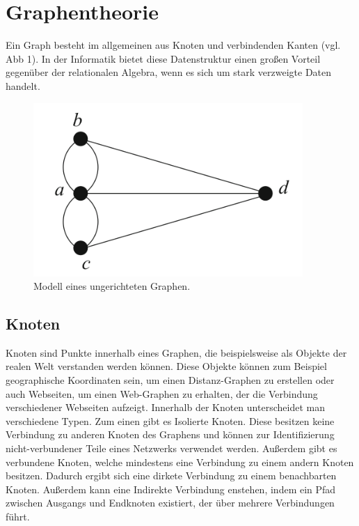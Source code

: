 \section{Graphentheorie} %
\label{sec:graphentheorie}
Ein Graph besteht im allgemeinen aus Knoten und verbindenden Kanten (vgl. Abb 1). In der Informatik bietet diese Datenstruktur einen großen Vorteil gegenüber der relationalen Algebra, wenn es sich um stark verzweigte Daten handelt. \citep{graphTheory}

\begin{figure}[h!]
	\centering
	\includegraphics[scale=1]{Illustrations/graph.png}
	\caption{Modell eines ungerichteten Graphen. \citep{graphTheory}}
\end{figure}
\newpage
\subsection{Knoten} %
\label{sec:knoten}
Knoten sind Punkte innerhalb eines Graphen, die beispielsweise als Objekte der realen Welt verstanden werden können. Diese Objekte können zum Beispiel geographische Koordinaten sein, um einen Distanz-Graphen zu erstellen oder auch Webseiten, um einen Web-Graphen zu erhalten, der die Verbindung verschiedener Webseiten aufzeigt.
Innerhalb der Knoten unterscheidet man verschiedene Typen. Zum einen gibt es Isolierte Knoten. Diese besitzen keine Verbindung zu anderen Knoten des Graphens und können zur Identifizierung nicht-verbundener Teile eines Netzwerks verwendet werden. Außerdem gibt es verbundene Knoten, welche mindestens eine Verbindung zu einem andern Knoten besitzen. Dadurch ergibt sich eine dirkete Verbindung zu einem benachbarten Knoten. Außerdem kann eine Indirekte Verbindung enstehen, indem ein Pfad zwischen Ausgangs und Endknoten existiert, der über mehrere Verbindungen führt. \citep{graphTheory}

